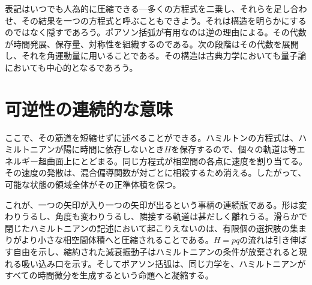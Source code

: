 表記はいつでも人為的に圧縮できる---多くの方程式を二乗し、それらを足し合わせ、その結果を一つの方程式と呼ぶこともできよう。それは構造を明らかにするのではなく隠すであろう。ポアソン括弧が有用なのは逆の理由による。その代数が時間発展、保存量、対称性を組織するのである。次の段階はその代数を展開し、それを角運動量に用いることである。その構造は古典力学においても量子論においても中心的となるであろう。

\section{可逆性の連続的な意味}

ここで、その筋道を短縮せずに述べることができる。ハミルトンの方程式は、ハミルトニアンが陽に時間に依存しないとき\(H\)を保存するので、個々の軌道は等エネルギー超曲面上にとどまる。同じ方程式が相空間の各点に速度を割り当てる。その速度の発散は、混合偏導関数が対ごとに相殺するため消える。したがって、可能な状態の領域全体がその正準体積を保つ。

これが、一つの矢印が入り一つの矢印が出るという事柄の連続版である。形は変わりうるし、角度も変わりうるし、隣接する軌道は甚だしく離れうる。滑らかで閉じたハミルトニアンの記述において起こりえないのは、有限個の選択肢の集まりがより小さな相空間体積へと圧縮されることである。\(H=pq\)の流れは引き伸ばす自由を示し、縮約された減衰振動子はハミルトニアンの条件が放棄されると現れる吸い込み口を示す。そしてポアソン括弧は、同じ力学を、ハミルトニアンがすべての時間微分を生成するという命題へと凝縮する。
